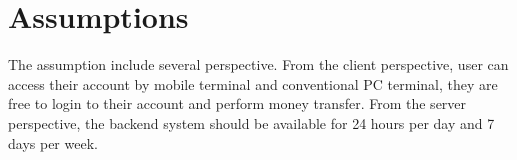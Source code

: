 \documentclass{scrreprt}
\begin{document}
\section{Assumptions}
The assumption include several perspective. From the client perspective, user can access their account by mobile terminal and conventional PC terminal, they are free to login to their account and perform money transfer. From the server perspective, the backend system should be available for 24 hours per day and 7 days per week.






\end{document}
